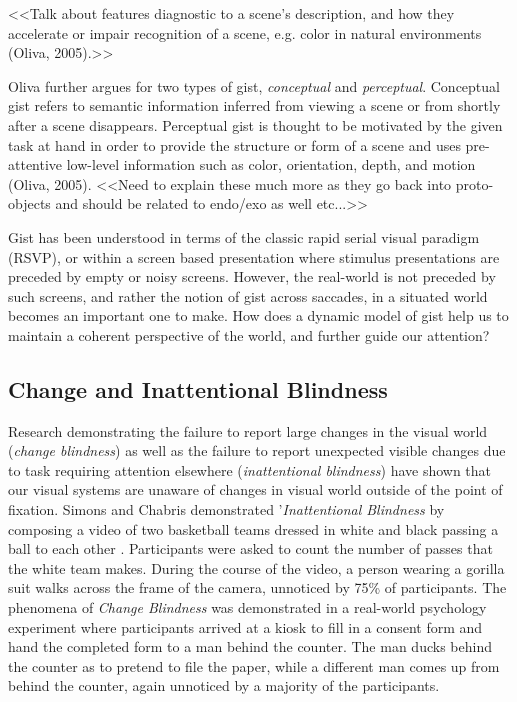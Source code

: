 <<Talk about features diagnostic to a scene's description, and how they accelerate or impair recognition of a scene, e.g. color in natural environments (Oliva, 2005).>>

Oliva further argues for two types of gist, \textit{conceptual} and \textit{perceptual}.  Conceptual gist refers to semantic information inferred from viewing a scene or from shortly after a scene disappears. Perceptual gist is thought to be motivated by the given task at hand in order to provide the structure or form of a scene and uses pre-attentive low-level information such as color, orientation, depth, and motion (Oliva, 2005).  <<Need to explain these much more as they go back into proto-objects and should be related to endo/exo as well etc...>>
	
Gist has been understood in terms of the classic rapid serial visual paradigm (RSVP), or within a screen based presentation where stimulus presentations are preceded by empty or noisy screens.  However, the real-world is not preceded by such screens, and rather the notion of gist across saccades, in a situated world becomes an important one to make.  How does a dynamic model of gist help us to maintain a coherent perspective of the world, and further guide our attention?  

\subsection{Change and Inattentional Blindness}

Research demonstrating the failure to report large changes in the visual world (\textit{change blindness}) as well as the failure to report unexpected visible changes due to task requiring attention elsewhere (\textit{inattentional blindness}) \cite{Simons1999,Rensink2000,Rensink2001,Hollingworth2001a} have shown that our visual systems are unaware of changes in visual world outside of the point of fixation.  Simons and Chabris demonstrated '\textit{Inattentional Blindness} by composing a video of two basketball teams dressed in white and black passing a ball to each other \cite{Simons1999}.  Participants were asked to count the number of passes that the white team makes.  During the course of the video, a person wearing a gorilla suit walks across the frame of the camera, unnoticed by 75\% of participants.  The phenomena of \textit{Change Blindness} was demonstrated in a real-world psychology experiment \cite{Simons1998} where participants arrived at a kiosk to fill in a consent form and hand the completed form to a man behind the counter.  The man ducks behind the counter as to pretend to file the paper, while a different man comes up from behind the counter, again unnoticed by a majority of the participants.  

